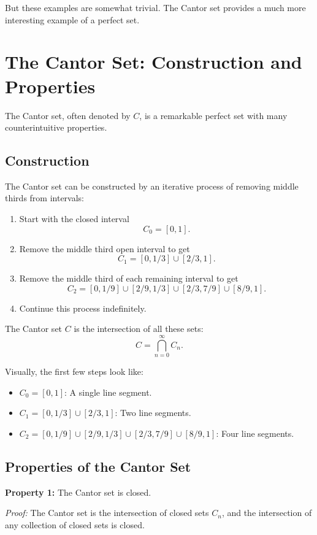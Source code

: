 \documentclass{article}
\begin{document}
But these examples are somewhat trivial. The Cantor set provides a much more interesting example of a perfect set.

\section{The Cantor Set: Construction and Properties}

The Cantor set, often denoted by $C$, is a remarkable perfect set with many counterintuitive properties.

\subsection{Construction}

The Cantor set can be constructed by an iterative process of removing middle thirds from intervals:
\begin{enumerate}
    \item Start with the closed interval 
    \[
    C_0 = [0,1].
    \]
    \item Remove the middle third open interval to get 
    \[
    C_1 = [0,1/3] \cup [2/3,1].
    \]
    \item Remove the middle third of each remaining interval to get 
    \[
    C_2 = [0,1/9] \cup [2/9,1/3] \cup [2/3,7/9] \cup [8/9,1].
    \]
    \item Continue this process indefinitely.
\end{enumerate}
The Cantor set $C$ is the intersection of all these sets:
\[
C = \bigcap_{n=0}^{\infty} C_n.
\]

Visually, the first few steps look like:
\begin{itemize}
    \item $C_0 = [0,1]$: A single line segment.
    \item $C_1 = [0,1/3] \cup [2/3,1]$: Two line segments.
    \item $C_2 = [0,1/9] \cup [2/9,1/3] \cup [2/3,7/9] \cup [8/9,1]$: Four line segments.
\end{itemize}

\subsection{Properties of the Cantor Set}

\textbf{Property 1:} The Cantor set is closed.

\textit{Proof:} The Cantor set is the intersection of closed sets $C_n$, and the intersection of any collection of closed sets is closed.
\end{document}
